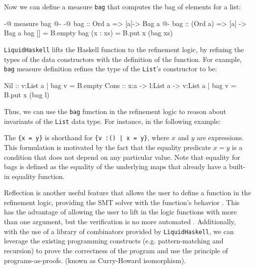 Now we can define a measure \texttt{bag} that computes the bag of elements for a list:
\begin{code}
	{-@ measure bag @-}
	{-@ bag :: Ord a => [a]-> Bag a @-}
	bag :: (Ord a) => [a] -> Bag a
	bag [] = B.empty
	bag (x : xs) = B.put x (bag xs)
\end{code}

\texttt{LiquidHaskell} lifts the Haskell function to the refinement logic, by refining the types of the data constructors with the
definition of the function\cite{niki_lecture_2024}.
For example, \texttt{bag} measure definition refines the type of the \texttt{List}'s constructor to be:
\begin{code}
	Nil  :: {v:List a | bag v = B.empty}
	Cons :: x:a -> l:List a -> {v:List a | bag v = B.put x (bag l)}
\end{code}

Thus, we can use the \texttt{bag} function in the refinement logic to reason about
invariants of the \texttt{List} data type. For instance, in the following example:

The \texttt{\{x = y\}} is shorthand for \texttt{\{v :() | x = y\}}, where $x$ and $y$ are expressions.
This formulation is motivated by the fact that the equality predicate $x = y$ is a condition that does not depend on any particular value.
Note that equality for bags is defined as the equality of the underlying maps that already have a built-in equality function.


Reflection is another useful feature that allows the user to define a function in the refinement logic, providing
the SMT solver with the function's behavior \cite{vazou2018}.
This has the advantage of allowing the user to lift in the logic functions with more than one argument, but the verification
is no more automated \cite{niki_lecture_2024}.
Additionally, with the use of a library of combinators provided by \texttt{LiquidHaskell}, we can leverage
the existing programming constructs (e.g. pattern-matching and recursion) to prove the correctness of the
program and use the principle of programs-as-proofs.
(known as Curry-Howard isomorphism)\cite{vazou2018, wadler_propositions_2015}.

